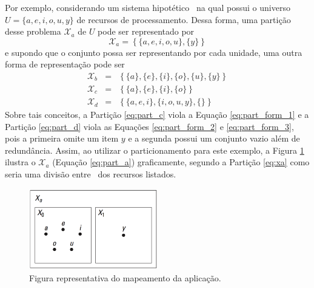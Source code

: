          Por exemplo, considerando um sistema hipotético \wearable\ na qual possui o universo $ U = \{a, e, i, o, u, y\} $ de recursos de processamento.
         Dessa forma, uma partição desse problema $ \mathcal{X}_a $ de $ U $ pode ser representado por
         \begin{equation}
         \mathcal{X}_a = \left\{\{a, e, i, o, u\}, \{y\}\right\} \label{eq:xa}
         \end{equation}
         e supondo que o conjunto possa ser representando por cada unidade, uma outra forma de representação pode ser
         \begin{eqnarray}
         \mathcal{X}_b &=& \left\{\{a\}, \{e\}, \{i\}, \{o\}, \{u\}, \{y\}\right\} \label{eq:part_a} \\
         \mathcal{X}_c &=& \left\{\{a\}, \{e\}, \{i\}, \{o\} \right\} \label{eq:part_c} \\
         \mathcal{X}_d &=& \left\{\{a, e, i\}, \{i, o, u, y\}, \{\}\right\} \label{eq:part_d}
         \end{eqnarray}
         Sobre tais conceitos, a Partição \ref{eq:part_c} viola a Equação \ref{eq:part_form_1} e a Partição \ref{eq:part_d} viola as Equações \ref{eq:part_form_2} e \ref{eq:part_form_3}, pois a primeira omite um item $y$ e a segunda possui um conjunto vazio além de redundância.
         Assim, ao utilizar o particionamento para este exemplo, a Figura \ref{fig:parti_alfabeto} ilustra o $ \mathcal{X}_a $ (Equação \ref{eq:part_a}) graficamente, segundo a Partição \ref{eq:xa} como seria uma divisão entre \hs\ dos recursos listados.

         \begin{figure}[h] \centering
            \includegraphics[width=0.5\textwidth]{img/f4-2.png}
            \caption{Figura representativa do mapeamento da aplicação.}
            \label{fig:parti_alfabeto}
         \end{figure}


